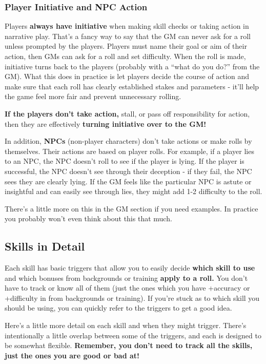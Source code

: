 \subsubsection{Player Initiative and NPC Action}

Players \textbf{always have initiative} when making skill checks or taking action in narrative play. That’s a fancy way to say that the GM can never ask for a roll unless prompted by the players. Players must name their goal or aim of their action, then GMs can ask for a roll and set difficulty. When the roll is made, initiative turns back to the players (probably with a ``what do you do?'' from the GM). What this does in practice is let players decide the course of action and make sure that each roll has clearly established stakes and parameters - it’ll help the game feel more fair and prevent unnecessary rolling. 

\textbf{If the players don’t take action,} stall, or pass off responsibility for action, then they are effectively \textbf{turning initiative over to the GM!} 

In addition, \textbf{NPCs} (non-player characters) don’t take actions or make rolls by themselves. Their actions are based on player rolls. For example, if a player lies to an NPC, the NPC doesn’t roll to see if the player is lying. If the player is successful, the NPC doesn’t see through their deception - if they fail, the NPC sees they are clearly lying. If the GM feels like the particular NPC is astute or insightful and can easily see through lies, they might add 1-2 difficulty to the roll.

There’s a little more on this in the GM section if you need examples. In practice you probably won’t even think about this that much.

\subsection{Skills in Detail}

Each skill has basic triggers that allow you to easily decide \textbf{which skill to use} and which bonuses from backgrounds or training \textbf{apply to a roll.} You don’t have to track or know all of them (just the ones which you have +accuracy or +difficulty in from backgrounds or training). If you’re stuck as to which skill you should be using, you can quickly refer to the triggers to get a good idea. 

Here’s a little more detail on each skill and when they might trigger. There’s intentionally a little overlap between some of the triggers, and each is designed to be somewhat flexible. \textbf{Remember, you don’t need to track all the skills, just the ones you are good or bad at!} 

